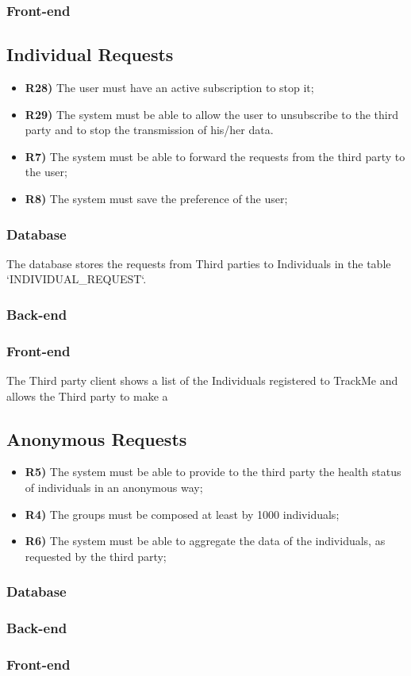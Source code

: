 \subsubsection*{Front-end}


\subsection{Individual Requests}
\begin{itemize}	
	\item {\color{Green}\textbf{R28)}} The user must have an active subscription to stop it;
	\item {\color{Green}\textbf{R29)}} The system must be able to allow the user to unsubscribe to the third party and to stop the transmission of his/her data.
	\item {\color{Green}\textbf{R7)}} The system must be able to forward the requests from the third party to the user;
	\item {\color{Green}\textbf{R8)}} The system must save the preference of the user;	
\end{itemize}

\subsubsection*{Database}
The database stores the requests from Third parties to Individuals in the table `INDIVIDUAL\_REQUEST`.

\subsubsection*{Back-end}


\subsubsection*{Front-end}

The Third party client shows a list of the Individuals registered to TrackMe and allows the Third party to make a 

\subsection{Anonymous Requests}	
\begin{itemize}
	\item {\color{Green}\textbf{R5)}} The system must be able to provide to the third party the health status of individuals
in an anonymous way;
	\item {\color{Green}\textbf{R4)}} The groups must be composed at least by 1000 individuals;
	\item {\color{Green}\textbf{R6)}} The system must be able to aggregate the data of the individuals, as requested by the
third party;
\end{itemize}
\subsubsection*{Database}


\subsubsection*{Back-end}


\subsubsection*{Front-end}